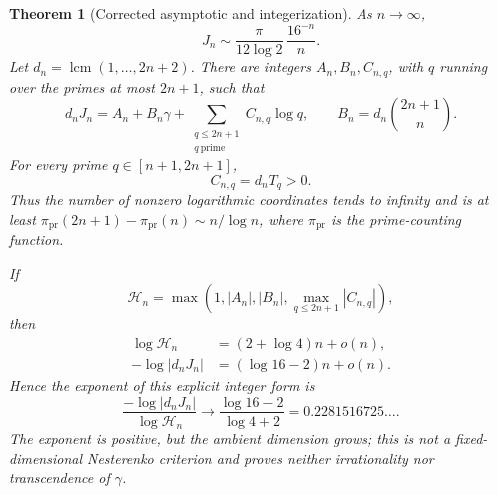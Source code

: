\documentclass[11pt]{article}
\newtheorem{theorem}{Theorem}[section]
\theoremstyle{definition}
\theoremstyle{remark}
\begin{document}
\begin{theorem}[Corrected asymptotic and integerization]
\label{thm:Jn-asymptotic-integerization}
As \(n\to\infty\),
\begin{equation}\label{eq:Jn-correct-asymptotic}
 \boxed{\displaystyle
 J_n\sim\frac{\pi}{12\log2}\,\frac{16^{-n}}n.}
\end{equation}
Let \(d_n=\operatorname{lcm}(1,\ldots,2n+2)\).  There are integers
\(A_n,B_n,C_{n,q}\), with \(q\) running over the primes at most \(2n+1\),
such that
\begin{equation}\label{eq:Jn-integer-linear-form}
 d_nJ_n=A_n+B_n\gamma+
 \sum_{\substack{q\le2n+1\\q\ \mathrm{prime}}}C_{n,q}\log q,
 \qquad
 B_n=d_n\binom{2n+1}{n}.
\end{equation}
For every prime \(q\in[n+1,2n+1]\),
\begin{equation}\label{eq:Jn-prime-coefficient-positive}
 C_{n,q}=d_nT_q>0.
\end{equation}
Thus the number of nonzero logarithmic coordinates tends to infinity and is
at least
\(\pi_{\mathrm{pr}}(2n+1)-\pi_{\mathrm{pr}}(n)\sim n/\log n\), where
\(\pi_{\mathrm{pr}}\) is the prime-counting function.

If
\[
 \mathcal H_n=\max\left(
 1,|A_n|,|B_n|,
 \max_{q\le2n+1}|C_{n,q}|
 \right),
\]
then
\begin{align}
 \log\mathcal H_n&=(2+\log4)n+o(n),
 \label{eq:Jn-integer-height}\\
 -\log|d_nJ_n|&=(\log16-2)n+o(n).
 \label{eq:Jn-integer-smallness}
\end{align}
Hence the exponent of this explicit integer form is
\begin{equation}\label{eq:Jn-correct-tau}
 \frac{-\log|d_nJ_n|}{\log\mathcal H_n}
 \longrightarrow
 \frac{\log16-2}{\log4+2}
 =0.2281516725\ldots.
\end{equation}
The exponent is positive, but the ambient dimension grows; this is not a
fixed-dimensional Nesterenko criterion and proves neither irrationality nor
transcendence of \(\gamma\).
\end{theorem}
\end{document}
